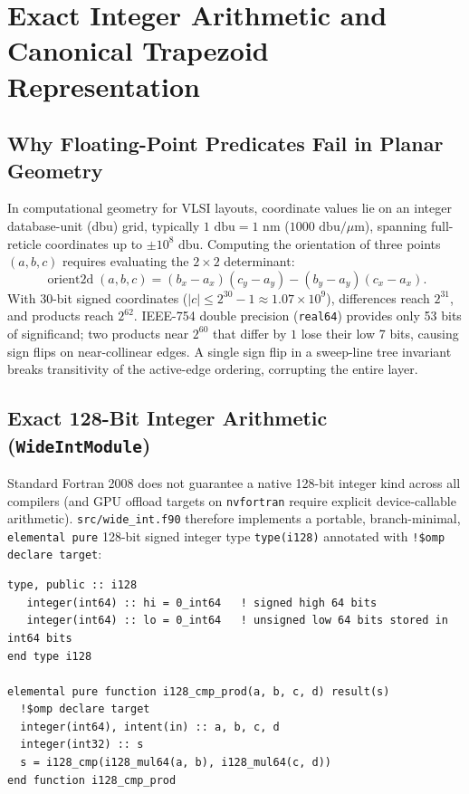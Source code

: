 \chapter{Exact Integer Arithmetic and Canonical Trapezoid Representation}
\label{ch:trapezoid}

\section{Why Floating-Point Predicates Fail in Planar Geometry}

In computational geometry for VLSI layouts, coordinate values lie on an integer database-unit (dbu) grid, typically $1\text{ dbu} = 1\text{ nm}$ ($1000\text{ dbu}/\mu\text{m}$), spanning full-reticle coordinates up to $\pm 10^8\text{ dbu}$. Computing the orientation of three points $(a,b,c)$ requires evaluating the $2 \times 2$ determinant:
\begin{equation}
  \operatorname{orient2d}(a, b, c) = (b_x - a_x)(c_y - a_y) - (b_y - a_y)(c_x - a_x).
\end{equation}
With 30-bit signed coordinates ($|c| \le 2^{30}-1 \approx 1.07 \times 10^9$), differences reach $2^{31}$, and products reach $2^{62}$. IEEE-754 double precision (\texttt{real64}) provides only 53 bits of significand; two products near $2^{60}$ that differ by $1$ lose their low 7 bits, causing sign flips on near-collinear edges. A single sign flip in a sweep-line tree invariant breaks transitivity of the active-edge ordering, corrupting the entire layer.

\section{Exact 128-Bit Integer Arithmetic (\texttt{WideIntModule})}

Standard Fortran 2008 does not guarantee a native 128-bit integer kind across all compilers (and GPU offload targets on \texttt{nvfortran} require explicit device-callable arithmetic). \texttt{src/wide\_int.f90} therefore implements a portable, branch-minimal, \texttt{elemental pure} 128-bit signed integer type \texttt{type(i128)} annotated with \texttt{!\$omp declare target}:

\begin{lstlisting}[caption={Portable 128-bit signed integer representation and exact product comparison in \texttt{src/wide\_int.f90}.},label={lst:wide_int}]
type, public :: i128
   integer(int64) :: hi = 0_int64   ! signed high 64 bits
   integer(int64) :: lo = 0_int64   ! unsigned low 64 bits stored in int64 bits
end type i128

elemental pure function i128_cmp_prod(a, b, c, d) result(s)
  !$omp declare target
  integer(int64), intent(in) :: a, b, c, d
  integer(int32) :: s
  s = i128_cmp(i128_mul64(a, b), i128_mul64(c, d))
end function i128_cmp_prod
\end{lstlisting}

